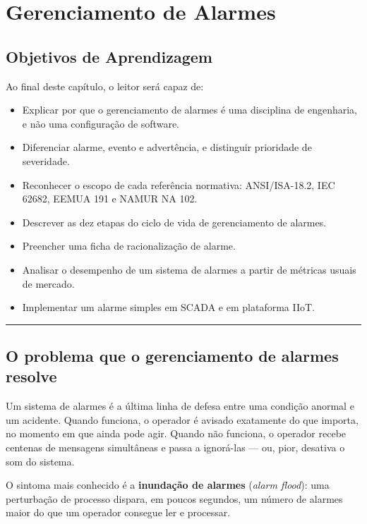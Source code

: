\chapter{Gerenciamento de Alarmes}\label{gerenciamento-de-alarmes}

\section*{Objetivos de Aprendizagem}

Ao final deste capítulo, o leitor será capaz de:

\begin{itemize}
\tightlist
\item
  Explicar por que o gerenciamento de alarmes é uma disciplina de engenharia, e não uma configuração de software.
\item
  Diferenciar alarme, evento e advertência, e distinguir prioridade de severidade.
\item
  Reconhecer o escopo de cada referência normativa: ANSI/ISA-18.2, IEC 62682, EEMUA 191 e NAMUR NA 102.
\item
  Descrever as dez etapas do ciclo de vida de gerenciamento de alarmes.
\item
  Preencher uma ficha de racionalização de alarme.
\item
  Analisar o desempenho de um sistema de alarmes a partir de métricas usuais de mercado.
\item
  Implementar um alarme simples em SCADA e em plataforma IIoT.
\end{itemize}

\begin{center}\rule{0.5\linewidth}{0.5pt}\end{center}

\section{O problema que o gerenciamento de alarmes resolve}\label{o-problema-que-o-gerenciamento-de-alarmes-resolve}

Um sistema de alarmes é a última linha de defesa entre uma condição anormal e um acidente. Quando funciona, o operador é avisado exatamente do que importa, no momento em que ainda pode agir. Quando não funciona, o operador recebe centenas de mensagens simultâneas e passa a ignorá-las --- ou, pior, desativa o som do sistema.

O sintoma mais conhecido é a \textbf{inundação de alarmes} (\emph{alarm flood}): uma perturbação de processo dispara, em poucos segundos, um número de alarmes maior do que um operador consegue ler e processar.

